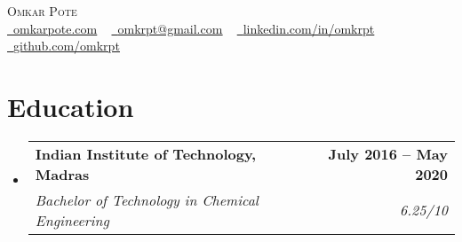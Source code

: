 \documentclass[letterpaper,11pt]{article}
\makeatletter
\newcommand{\resumeSubheading}[4]{
  \vspace{-2pt}\item
    \begin{tabular*}{1.0\textwidth}[t]{l@{\extracolsep{\fill}}r}
      \textbf{#1} & \textbf{\small #2} \\
      \textit{\small#3} & \textit{\small #4} \\
    \end{tabular*}\vspace{-7pt}
}
\newcommand{\resumeSubHeadingListStart}{\begin{itemize}[leftmargin=0.0in, label={}]}
\newcommand{\resumeSubHeadingListEnd}{\end{itemize}}
\makeatother
\begin{document}

\begin{center}
    {\vspace*{30pt} \Huge \scshape Omkar Pote} \\ \vspace{5pt} 
    \small
    \href{https://omkarpote.com}{\raisebox{-0.2\height}\faGlobe\  \underline{omkarpote.com}} ~ 
    \href{mailto:omkrpt@gmail.com}{\raisebox{-0.2\height}\faEnvelope\  \underline{omkrpt@gmail.com}} ~ 
    \href{https://linkedin.com/in/omkrpt/}{\raisebox{-0.2\height}\faLinkedin\ \underline{linkedin.com/in/omkrpt}}  ~
    \href{https://github.com/omkrpt}{\raisebox{-0.2\height}\faGithub\ \underline{github.com/omkrpt}}
    \vspace{-8pt}
\end{center}


\section{Education}
  \resumeSubHeadingListStart
    \resumeSubheading
      {Indian Institute of Technology, Madras}{July 2016 -- May 2020}
      {Bachelor of Technology in Chemical Engineering}{6.25/10}
  \resumeSubHeadingListEnd

\end{document}
